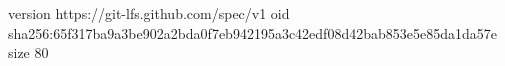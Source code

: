 version https://git-lfs.github.com/spec/v1
oid sha256:65f317ba9a3be902a2bda0f7eb942195a3c42edf08d42bab853e5e85da1da57e
size 80
